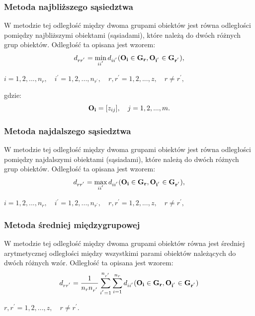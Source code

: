 \documentclass[12pt,a4paper]{report}
\begin{document}
\subsubsection{Metoda najbliższego sąsiedztwa}
\noindent

W metodzie tej odległość między dwoma grupami obiektów jest równa odległości pomiędzy najbliższymi obiektami (sąsiadami), które należą do dwóch różnych grup obiektów. Odległość ta opisana jest wzorem:
\begin{equation}
d_{rr^{'}}= \min\limits_{ii^{'}} {d_{ii^{'}}(\bf{O_i} \in G_{r}, O_{i^{'}} \in G_{r^{'}})},
\end{equation}
\begin{center}
$i=1,2,...,n_{r}, \quad i^{'}=1,2,...,n_{r^{'}}, \quad r,r^{'}=1,2,...,z, \quad r \neq r^{'}, $
\end{center}
gdzie:\\
\begin{equation}
\bold{O_{i}}=[z_{ij}], \quad j=1,2,...,m.
\end{equation}

\subsubsection{Metoda najdalszego sąsiedztwa}
\noindent

W metodzie tej odległość między dwoma grupami obiektów jest równa odległości pomiędzy najdalszymi obiektami (sąsiadami), które należą do dwóch różnych grup obiektów. Odległość ta opisana jest wzorem: 
\begin{equation}
d_{rr^{'}}= \max\limits_{ii^{'}} {d_{ii^{'}}(\bf{O_i} \in G_{r}, O_{i^{'}} \in G_{r^{'}})},
\end{equation}
\begin{center}
$i=1,2,...,n_{r}, \quad i^{'}=1,2,...,n_{r^{'}}, \quad r,r^{'}=1,2,...,z, \quad r \neq r^{'}, $
\end{center}

\subsubsection{Metoda średniej międzygrupowej}
\noindent

W metodzie tej odległość między dwoma grupami obiektów równa jest średniej arytmetycznej odległości między wszystkimi parami obiektów należących do dwóch różnych wzór. Odległość ta opisana jest wzorem: 
\begin{equation}
d_{rr^{'}}=\frac{1}{n_{r}n_{r^{'}}}\sum_{i^{'}=1}^{n_{r^{'}}}\sum_{i=1}^{n_{r}} d_{ii^{'}}(\bf{O_i} \in G_{r}, O_{i^{'}} \in G_{r^{'}})
\end{equation}
\begin{center}
$r,r^{'}=1,2,...,z, \quad r \neq r^{'}. $
\end{center}
\end{document}
